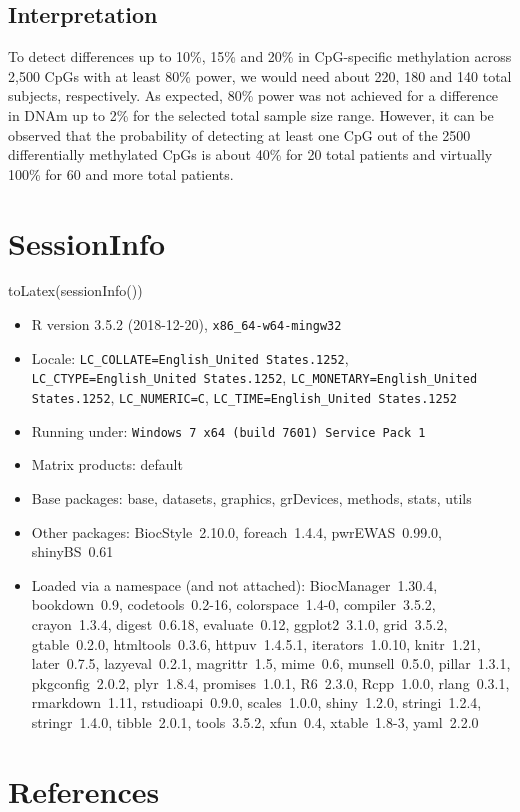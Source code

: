 \documentclass[]{article}
\newcommand{\hlstd}[1]{\textcolor[rgb]{0.251,0.251,0.251}{#1}}%
\newcommand{\hlkwd}[1]{\textcolor[rgb]{0.878,0.439,0.125}{#1}}%
\newenvironment{Shaded}{\begin{myshaded}}{\end{myshaded}}
\newcommand{\KeywordTok}[1]{\hlkwd{#1}}
\newcommand{\NormalTok}[1]{\hlstd{#1}}
\begin{document}
\subsection{Interpretation}\label{interpretation}

To detect differences up to 10\%, 15\% and 20\% in CpG-specific
methylation across 2,500 CpGs with at least 80\% power, we would need
about 220, 180 and 140 total subjects, respectively. As expected, 80\%
power was not achieved for a difference in DNAm up to 2\% for the
selected total sample size range. However, it can be observed that the
probability of detecting at least one CpG out of the 2500 differentially
methylated CpGs is about 40\% for 20 total patients and virtually 100\%
for 60 and more total patients.

\section{SessionInfo}\label{sessioninfo}

\begin{Shaded}
\begin{Highlighting}[]
\KeywordTok{toLatex}\NormalTok{(}\KeywordTok{sessionInfo}\NormalTok{())}
\end{Highlighting}
\end{Shaded}

\begin{itemize}\raggedright
  \item R version 3.5.2 (2018-12-20), \verb|x86_64-w64-mingw32|
  \item Locale: \verb|LC_COLLATE=English_United States.1252|, \verb|LC_CTYPE=English_United States.1252|, \verb|LC_MONETARY=English_United States.1252|, \verb|LC_NUMERIC=C|, \verb|LC_TIME=English_United States.1252|
  \item Running under: \verb|Windows 7 x64 (build 7601) Service Pack 1|
  \item Matrix products: default
  \item Base packages: base, datasets, graphics, grDevices, methods,
    stats, utils
  \item Other packages: BiocStyle~2.10.0, foreach~1.4.4,
    pwrEWAS~0.99.0, shinyBS~0.61
  \item Loaded via a namespace (and not attached):
    BiocManager~1.30.4, bookdown~0.9, codetools~0.2-16,
    colorspace~1.4-0, compiler~3.5.2, crayon~1.3.4, digest~0.6.18,
    evaluate~0.12, ggplot2~3.1.0, grid~3.5.2, gtable~0.2.0,
    htmltools~0.3.6, httpuv~1.4.5.1, iterators~1.0.10, knitr~1.21,
    later~0.7.5, lazyeval~0.2.1, magrittr~1.5, mime~0.6,
    munsell~0.5.0, pillar~1.3.1, pkgconfig~2.0.2, plyr~1.8.4,
    promises~1.0.1, R6~2.3.0, Rcpp~1.0.0, rlang~0.3.1,
    rmarkdown~1.11, rstudioapi~0.9.0, scales~1.0.0, shiny~1.2.0,
    stringi~1.2.4, stringr~1.4.0, tibble~2.0.1, tools~3.5.2,
    xfun~0.4, xtable~1.8-3, yaml~2.2.0
\end{itemize}

\section{References}\label{references}
\end{document}
